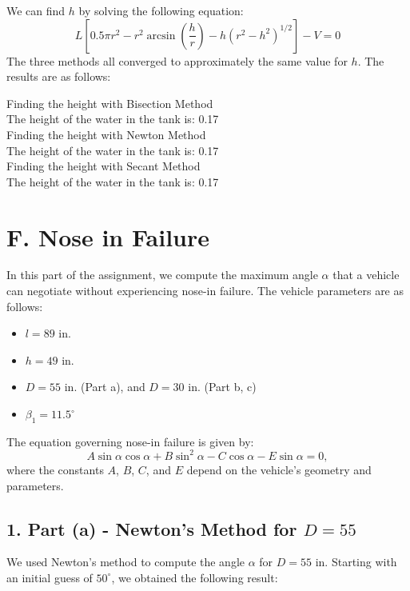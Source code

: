 \documentclass[a4paper]{article}
\begin{document}
We can find \( h \) by solving the following equation:
\[
L \left[ 0.5 \pi r^2 - r^2 \arcsin \left( \frac{h}{r} \right) - h \left( r^2 - h^2 \right)^{1/2} \right] - V = 0
\]
The three methods all converged to approximately the same value for \( h \). The results are as follows:
\begin{tcolorbox}[title=Output Results, colback=white, colframe=black]
  Finding the height with Bisection Method\\
  The height of the water in the tank is: 0.17\\
  Finding the height with Newton Method\\
  The height of the water in the tank is: 0.17\\
  Finding the height with Secant Method\\
  The height of the water in the tank is: 0.17
\end{tcolorbox}

\section*{F. Nose in Failure}
In this part of the assignment, we compute the maximum angle \( \alpha \) that a vehicle can negotiate without experiencing nose-in failure. The vehicle parameters are as follows:

\begin{itemize}
    \item \( l = 89 \text{ in.} \)
    \item \( h = 49 \text{ in.} \)
    \item \( D = 55 \text{ in.} \) (Part a), and \( D = 30 \text{ in.} \) (Part b, c)
    \item \( \beta_1 = 11.5^\circ \)
\end{itemize}

The equation governing nose-in failure is given by:
\[
A \sin \alpha \cos \alpha + B \sin^2 \alpha - C \cos \alpha - E \sin \alpha = 0,
\]
where the constants \( A \), \( B \), \( C \), and \( E \) depend on the vehicle's geometry and parameters.

\subsection*{1. Part (a) - Newton’s Method for \( D = 55 \)}

We used Newton’s method to compute the angle \( \alpha \) for \( D = 55 \) in. Starting with an initial guess of \( 50^\circ \), we obtained the following result:
\end{document}

